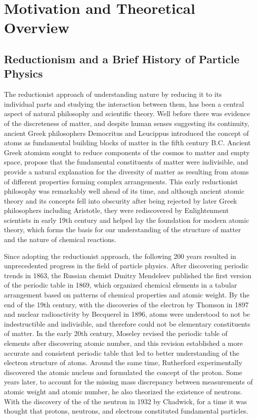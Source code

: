 
\chapter{Motivation and Theoretical Overview}

\section{Reductionism and a Brief History of Particle Physics}
The reductionist approach of understanding nature by reducing it to its individual parts and studying the interaction between them, has been a central aspect of natural philosophy and scientific theory.
Well before there was evidence of the discreteness of matter, and despite human senses suggesting its continuity, ancient Greek philosophers Democritus and Leucippus introduced the concept of atoms as fundamental building blocks of matter in the fifth century B.C.
Ancient Greek atomism sought to reduce components of the cosmos to matter and empty space, propose that the fundamental constituents of matter were indivisible, and provide a natural explanation for the diversity of matter as resulting from atoms of different properties forming complex arrangements.
This early reductionist philosophy was remarkably well ahead of its time, and although ancient atomic theory and its concepts fell into obscurity after being rejected by later Greek philosophers including Aristotle, they were rediscovered by Enlightenment scientists in early 19th century and helped lay the foundation for modern atomic theory, which forms the basis for our understanding of the structure of matter and the nature of chemical reactions.

Since adopting the reductionist approach, the following 200 years resulted in unprecedented progress in the field of particle physics.
After discovering periodic trends in 1863, the Russian chemist Dmitry Mendeleev published the first version of the periodic table in 1869, which organized chemical elements in a tabular arrangement based on patterns of chemical properties and atomic weight.
By the end of the 19th century, with the discoveries of the electron by Thomson in 1897 and nuclear radioactivity by Becquerel in 1896, atoms were understood to not be indestructible and indivisible, and therefore could not be elementary constituents of matter.
In the early 20th century, Moseley revised the periodic table of elements after discovering atomic number, and this revision established a more accurate and consistent periodic table that led to better understanding of the electron structure of atoms.
Around the same time, Rutherford experimentally discovered the atomic nucleus and formulated the concept of the proton.
Some years later, to account for the missing mass discrepancy between measurements of atomic weight and atomic number, he also theorized the existence of neutrons.
With the discovery of the of the neutron in 1932 by Chadwick, for a time it was thought that protons, neutrons, and electrons constituted fundamental particles.

